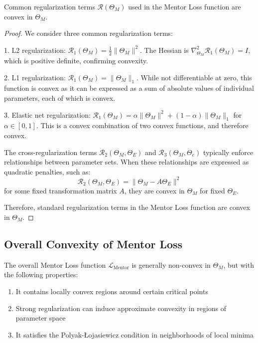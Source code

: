 \begin{theorem}
Common regularization terms $\mathcal{R}(\Theta_M)$ used in the Mentor Loss function are convex in $\Theta_M$.
\end{theorem}

\begin{proof}
We consider three common regularization terms:

1. L2 regularization: $\mathcal{R}_1(\Theta_M) = \frac{1}{2}\|\Theta_M\|^2$. The Hessian is $\nabla^2_{\Theta_M} \mathcal{R}_1(\Theta_M) = I$, which is positive definite, confirming convexity.

2. L1 regularization: $\mathcal{R}_1(\Theta_M) = \|\Theta_M\|_1$. While not differentiable at zero, this function is convex as it can be expressed as a sum of absolute values of individual parameters, each of which is convex.

3. Elastic net regularization: $\mathcal{R}_1(\Theta_M) = \alpha\|\Theta_M\|^2 + (1-\alpha)\|\Theta_M\|_1$ for $\alpha \in [0, 1]$. This is a convex combination of two convex functions, and therefore convex.

The cross-regularization terms $\mathcal{R}_2(\Theta_M, \Theta_E)$ and $\mathcal{R}_3(\Theta_M, \Theta_e)$ typically enforce relationships between parameter sets. When these relationships are expressed as quadratic penalties, such as:
\begin{equation}
\mathcal{R}_2(\Theta_M, \Theta_E) = \|\Theta_M - A\Theta_E\|^2
\end{equation}
for some fixed transformation matrix $A$, they are convex in $\Theta_M$ for fixed $\Theta_E$.

Therefore, standard regularization terms in the Mentor Loss function are convex in $\Theta_M$.
\end{proof}

\subsection{Overall Convexity of Mentor Loss}

\begin{theorem}
The overall Mentor Loss function $\mathcal{L}_{\text{Mentor}}$ is generally non-convex in $\Theta_M$, but with the following properties:
\begin{enumerate}
    \item It contains locally convex regions around certain critical points
    \item Strong regularization can induce approximate convexity in regions of parameter space
    \item It satisfies the Polyak-Łojasiewicz condition in neighborhoods of local minima
\end{enumerate}
\end{theorem}

